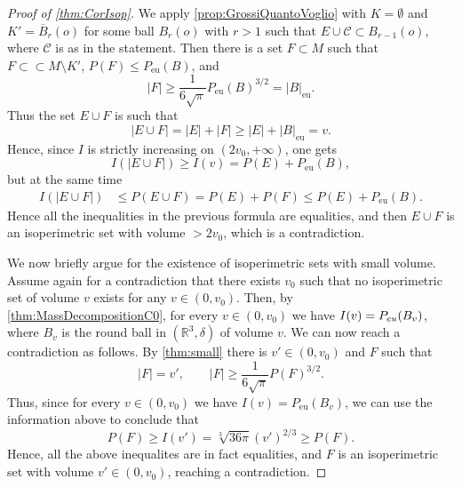 \documentclass[10pt,a4paper]{amsart}
\newcommand{\R}{\mathbb{R}}
\begin{document}
\begin{proof}[Proof of \cref{thm:CorIsop}]
We apply \cref{prop:GrossiQuantoVoglio} with $K=\emptyset$ and $K'=\overline{B}_r(o)$ for some ball $B_r(o)$ with $r>1$ such that $E\cup \mathcal{C} \subset B_{r-1}(o)$, where $\mathcal{C}$ is as in the statement. Then there is a set $F\subset M$ such that $F\subset\subset M\setminus K'$, $P(F)\leq P_{\mathrm{eu}}(B)$, and 
\[
|F|\geq \frac{1}{6\sqrt{\pi}}P_{\mathrm{eu}}(B)^{3/2} = |B|_{\mathrm{eu}}.
\]
 Thus the set $E\cup F$ is such that 
\[
|E\cup F| = |E|+|F| \geq |E|+|B|_{\mathrm{eu}} = v.
\]
Hence, since $I$ is strictly increasing on $(2v_0,+\infty)$, one gets
\[
I(|E\cup F|) \geq I(v) = P(E)+P_{\mathrm{eu}}(B),
\]
but at the same time
\[
\begin{split}
I(|E\cup F|) &\leq P(E\cup F)=P(E)+P(F)\leq P(E)+P_{\mathrm{eu}}(B).
\end{split}
\]
Hence all the inequalities in the previous formula are equalities, and then $E\cup F$ is an isoperimetric set with volume $>2v_0$, which is a contradiction. 
\smallskip

We now briefly argue for the existence of isoperimetric sets with small volume. Assume again for a contradiction that there exists $v_0$ such that no isoperimetric set of volume $v$ exists for any $v \in (0, v_0)$. Then, by \cref{thm:MassDecompositionC0}, for every $v\in (0,v_0)$ we have $I(v) = P_{\rm eu}(B_v)$, where $B_v$ is the round ball in $(\R^3, \delta)$ of volume $v$. We can now reach a contradiction as follows. By \cref{thm:small} there is $v'\in (0,v_0)$ and $F$ such that 
\[
|F|=v', \qquad |F|\geq \frac{1}{6\sqrt{\pi}}P(F)^{3/2}.
\]
Thus, since for every $v\in (0,v_0)$ we have $I(v)=P_{\mathrm{eu}}(B_v)$, we can use the information above to conclude that 
\[
P(F)\geq I(v')= \sqrt[3]{36\pi} (v')^{2/3} \geq P(F).
\]
Hence, all the above inequalites are in fact equalities, and $F$ is an isoperimetric set with volume $v'\in (0,v_0)$, reaching a contradiction.
\end{proof}
\end{document}
